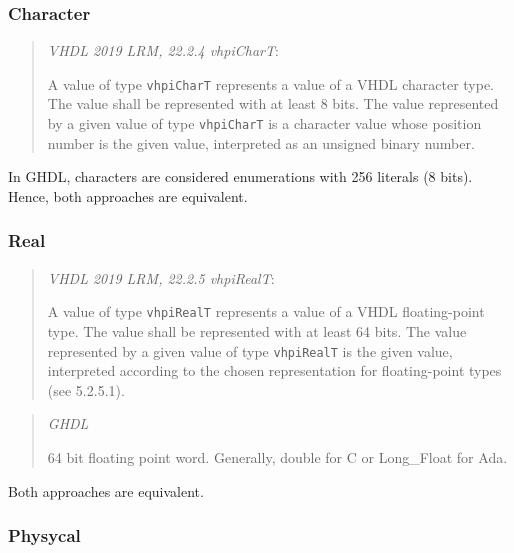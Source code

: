 \documentclass[
]{article}
\begin{document}
\hypertarget{character}{%
\subsubsection{Character}\label{character}}

\begin{quote}
\emph{VHDL 2019 LRM, 22.2.4 vhpiCharT}:

A value of type \texttt{vhpiCharT} represents a value of a VHDL character type.
The value shall be represented with at least 8 bits.
The value represented by a given value of type \texttt{vhpiCharT} is a character value whose position number is the given value, interpreted as an unsigned binary number.
\end{quote}

In GHDL, characters are considered enumerations with 256 literals (8 bits). Hence, both approaches are equivalent.

\hypertarget{real}{%
\subsubsection{Real}\label{real}}

\begin{quote}
\emph{VHDL 2019 LRM, 22.2.5 vhpiRealT}:

A value of type \texttt{vhpiRealT} represents a value of a VHDL floating-point type.
The value shall be represented with at least 64 bits.
The value represented by a given value of type \texttt{vhpiRealT} is the given value, interpreted according to the chosen representation for floating-point types (see 5.2.5.1).
\end{quote}

\begin{quote}
\emph{GHDL}

64 bit floating point word. Generally, double for C or Long\_Float for Ada.
\end{quote}

Both approaches are equivalent.

\hypertarget{physycal}{%
\subsubsection{Physycal}\label{physycal}}
\end{document}
